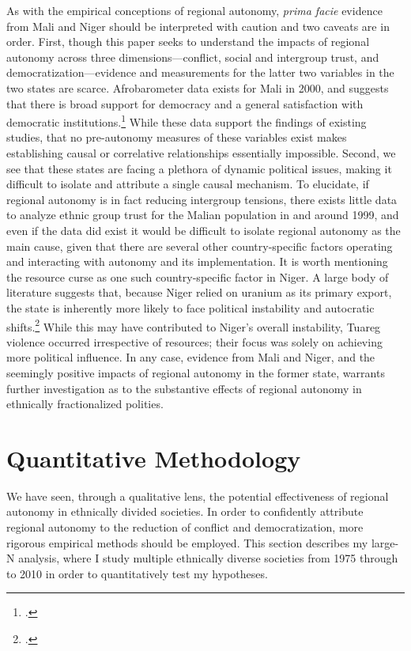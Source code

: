 \documentclass[12pt]{article}
\begin{document}
As with the empirical conceptions of regional autonomy, \textit{prima facie} evidence from Mali and Niger should be interpreted with caution and two caveats are in order. First, though this paper seeks to understand the impacts of regional autonomy across three dimensions---conflict, social and intergroup trust, and democratization---evidence and measurements for the latter two variables in the two states are scarce. Afrobarometer data exists for Mali in 2000, and suggests that there is broad support for democracy and a general satisfaction with democratic institutions.\footcite{afrobarometer_afrobarometer_nodate} While these data support the findings of existing studies, that no pre-autonomy measures of these variables exist makes establishing causal or correlative relationships essentially impossible. Second, we see that these states are facing a plethora of dynamic political issues, making it difficult to isolate and attribute a single causal mechanism. To elucidate, if regional autonomy is in fact reducing intergroup tensions, there exists little data to analyze ethnic group trust for the Malian population in and around 1999, and even if the data did exist it would be difficult to isolate regional autonomy as the main cause, given that there are several other country-specific factors operating and interacting with autonomy and its implementation. It is worth mentioning the resource curse as one such country-specific factor in Niger. A large body of literature suggests that, because Niger relied on uranium as its primary export, the state is inherently more likely to face political instability and autocratic shifts.\footcite{mehlum_institutions_2006, sachs_curse_2001} While this may have contributed to Niger's overall instability, Tuareg violence occurred irrespective of resources; their focus was solely on achieving more political influence. In any case, evidence from Mali and Niger, and the seemingly positive impacts of regional autonomy in the former state, warrants further investigation as to the substantive effects of regional autonomy in ethnically fractionalized polities. 

\section{Quantitative Methodology}
We have seen, through a qualitative lens, the potential effectiveness of regional autonomy in ethnically divided societies. In order to confidently attribute regional autonomy to the reduction of conflict and democratization, more rigorous empirical methods should be employed. This section describes my large-N analysis, where I study multiple ethnically diverse societies from 1975 through to 2010 in order to quantitatively test my hypotheses. 
\end{document}

